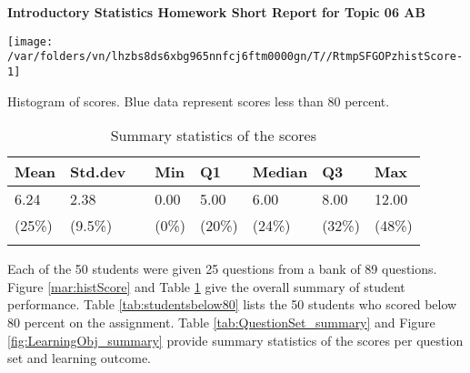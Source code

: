 \documentclass[12pt,english,nohyper]{tufte-handout}\usepackage[]{graphicx}\usepackage[]{color}
\newenvironment{knitrout}{}{} %
\begin{document}
\setcaptionfont{
  \normalfont\footnotesize
  \color{black}
}





\centerline{\Large\bf Introductory Statistics Homework Short Report for Topic 06 AB}
\vspace{1cm}

\begin{knitrout}
\color{fgcolor}\begin{marginfigure}
\texttt{[image: /var/folders/vn/lhzbs8ds6xbg965nnfcj6ftm0000gn/T//RtmpSFGOPzhistScore-1]} \caption[Histogram of scores]{Histogram of scores. Blue data represent scores less than 80 percent.}\label{mar:histScore}
\end{marginfigure}


\end{knitrout}

\begin{longtable}{llllllll}
  \hline
Mean & Std.dev &   & Min & Q1 & Median & Q3 & Max \\ 
  \hline
6.24 & 2.38 &  & 0.00 & 5.00 & 6.00 & 8.00 & 12.00 \\ 
  (25\%) & (9.5\%) &  & (0\%) & (20\%) & (24\%) & (32\%) & (48\%) \\ 
   \hline
\hline
\caption{Summary statistics of the scores} 
\label{tab:summary}
\end{longtable}




\newif\ifPositive

\Positivetrue

\ifPositive
Each of the 50 students were given 25 questions from a bank of 89 questions. Figure \ref{mar:histScore} and Table \ref{tab:summary} give the overall summary of student performance. Table \ref{tab:studentsbelow80} lists the 50 students who scored below 80 percent on the assignment. Table \ref{tab:QuestionSet_summary} and Figure \ref{fig:LearningObj_summary} provide summary statistics of the scores per question set and learning outcome.
\else
Each of the 50 students were given 25 questions from a bank of 89 questions. Figure \ref{mar:histScore} and Table \ref{tab:summary} give the overall summary of student performance. Table \ref{tab:QuestionSet_summary} and Figure \ref{fig:LearningObj_summary} provide summary statistics of the scores per question set and learning outcome.
\fi
\end{document}
